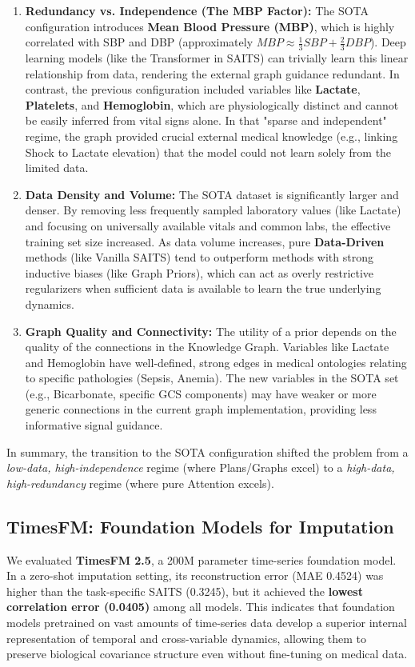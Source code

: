 \begin{enumerate}
    \item \textbf{Redundancy vs. Independence (The MBP Factor):}
    The SOTA configuration introduces \textbf{Mean Blood Pressure (MBP)}, which is highly correlated with SBP and DBP (approximately $MBP \approx \frac{1}{3}SBP + \frac{2}{3}DBP$). Deep learning models (like the Transformer in SAITS) can trivially learn this linear relationship from data, rendering the external graph guidance redundant. In contrast, the previous configuration included variables like \textbf{Lactate}, \textbf{Platelets}, and \textbf{Hemoglobin}, which are physiologically distinct and cannot be easily inferred from vital signs alone. In that "sparse and independent" regime, the graph provided crucial external medical knowledge (e.g., linking Shock to Lactate elevation) that the model could not learn solely from the limited data.

    \item \textbf{Data Density and Volume:}
    The SOTA dataset is significantly larger and denser. By removing less frequently sampled laboratory values (like Lactate) and focusing on universally available vitals and common labs, the effective training set size increased. As data volume increases, pure \textbf{Data-Driven} methods (like Vanilla SAITS) tend to outperform methods with strong inductive biases (like Graph Priors), which can act as overly restrictive regularizers when sufficient data is available to learn the true underlying dynamics.

    \item \textbf{Graph Quality and Connectivity:}
    The utility of a prior depends on the quality of the connections in the Knowledge Graph. Variables like Lactate and Hemoglobin have well-defined, strong edges in medical ontologies relating to specific pathologies (Sepsis, Anemia). The new variables in the SOTA set (e.g., Bicarbonate, specific GCS components) may have weaker or more generic connections in the current graph implementation, providing less informative signal guidance.
\end{enumerate}

In summary, the transition to the SOTA configuration shifted the problem from a \textit{low-data, high-independence} regime (where Plans/Graphs excel) to a \textit{high-data, high-redundancy} regime (where pure Attention excels).

\subsection{TimesFM: Foundation Models for Imputation}
We evaluated \textbf{TimesFM 2.5}, a 200M parameter time-series foundation model. In a zero-shot imputation setting, its reconstruction error (MAE 0.4524) was higher than the task-specific SAITS (0.3245), but it achieved the \textbf{lowest correlation error (0.0405)} among all models. This indicates that foundation models pretrained on vast amounts of time-series data develop a superior internal representation of temporal and cross-variable dynamics, allowing them to preserve biological covariance structure even without fine-tuning on medical data.

